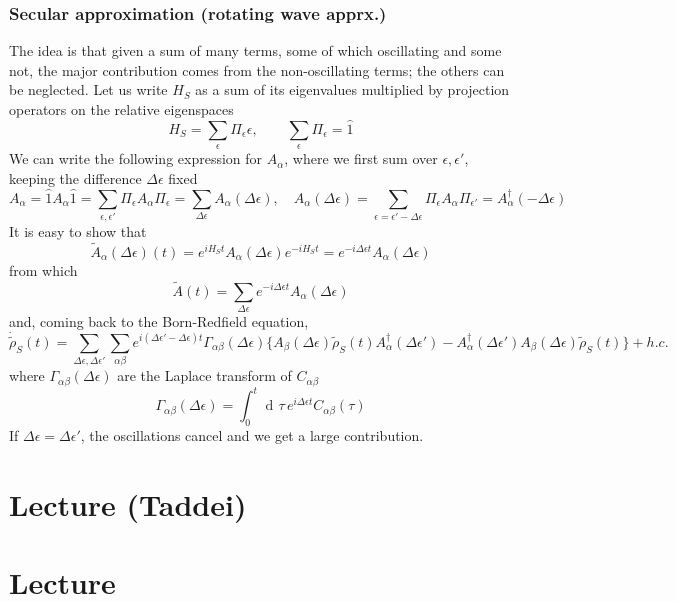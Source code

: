 \documentclass[a4paper, 11pt]{article}
\newcommand{\dd}{\mathop{\mathrm{d}\!}{}}
\begin{document}
	\subsubsection{Secular approximation (rotating wave apprx.)}
	The idea is that given a sum of many terms, some of which oscillating and some not, the major contribution comes from the non-oscillating terms; the others can be neglected. Let us write $H_S$ as a sum of its eigenvalues multiplied by projection operators on the relative eigenspaces
	\[ H_S = \sum_{\epsilon} \Pi_\epsilon \epsilon,\qquad \sum_\epsilon \Pi_\epsilon = \hat{1} \]
	We can write the following expression for $A_\alpha$, where we first sum over $\epsilon,\epsilon'$, keeping the difference $\Delta\epsilon$ fixed
	\[ A_\alpha = \hat{1}A_\alpha \hat{1} = \sum_{\epsilon,\epsilon'} \Pi_{\epsilon} A_\alpha \Pi_{\epsilon} = \sum_{\Delta\epsilon} A_\alpha(\Delta\epsilon),\quad A_\alpha(\Delta\epsilon) = \sum_{\epsilon=\epsilon'-\Delta\epsilon} \Pi_\epsilon A_\alpha \Pi_{\epsilon'} = A_\alpha^\dagger(-\Delta\epsilon) \]
	It is easy to show that
	\[ \tilde{A}_\alpha(\Delta\epsilon)(t) = e^{iH_S t} A_\alpha(\Delta\epsilon) e^{-iH_S t} = e^{-i\Delta\epsilon t} A_\alpha(\Delta\epsilon) \]
	from which
	\[ \tilde{A}(t) = \sum_{\Delta\epsilon} e^{-i\Delta\epsilon t} A_\alpha(\Delta\epsilon) \]
	and, coming back to the Born-Redfield equation,
	\[ \dot{\tilde{\rho}}_S(t) = \sum_{\Delta\epsilon,\Delta\epsilon'} \sum_{\alpha\beta} e^{i(\Delta\epsilon'-\Delta\epsilon) t} 
	\Gamma_{\alpha\beta}(\Delta\epsilon) \{ A_\beta(\Delta\epsilon) \tilde{\rho}_S(t) A_\alpha^\dagger(\Delta\epsilon')
	- A_\alpha^\dagger(\Delta\epsilon') A_\beta(\Delta\epsilon) \tilde{\rho}_S(t) \} + h.c. \]
	where $\Gamma_{\alpha\beta}(\Delta\epsilon)$ are the Laplace transform of $C_{\alpha\beta}$
	\[ \Gamma_{\alpha\beta} (\Delta\epsilon) = \int_{0}^{t} \dd \tau\, e^{i\Delta\epsilon t} C_{\alpha\beta}(\tau) \]
	If $\Delta\epsilon=\Delta\epsilon'$, the oscillations cancel and we get a large contribution.
	
	\section{Lecture (Taddei)}
	
	\section{Lecture}
\end{document}
